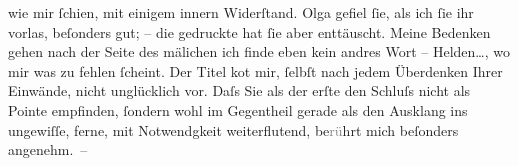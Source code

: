                   {\pb}wie mir{ }ſchien, mit einigem innern
               Widerſtand. Olga gefiel{ }ſie, als ich{ }ſie ihr
               vorlas, beſonders gut; – die gedruckte hat{ }ſie aber enttäuscht. Meine Bedenken gehen
               nach der Seite des mä\textcolor{gray}{{\geminationn}}lichen {\dotstwo} ich f\textcolor{gray}{i}nde eben kein
               andres Wort – Helden{\dots}, wo mir was zu fehlen{ }ſcheint. Der
               Titel ko{\geminationm}t mir,{ }ſelbſt nach jedem Überdenken Ihrer
               Einwände, nicht un{\pb}glücklich vor. Daſs Sie
               als der erſte den Schluſs nicht als Pointe empfinden,{ }ſondern wohl im Gegentheil
               gerade als den Ausklang ins ungewiſſe, ferne, mit Notwendgkeit weiterflutend,
                  be\textcolor{gray}{rü}hrt mich beſonders angenehm. –\pend
           
